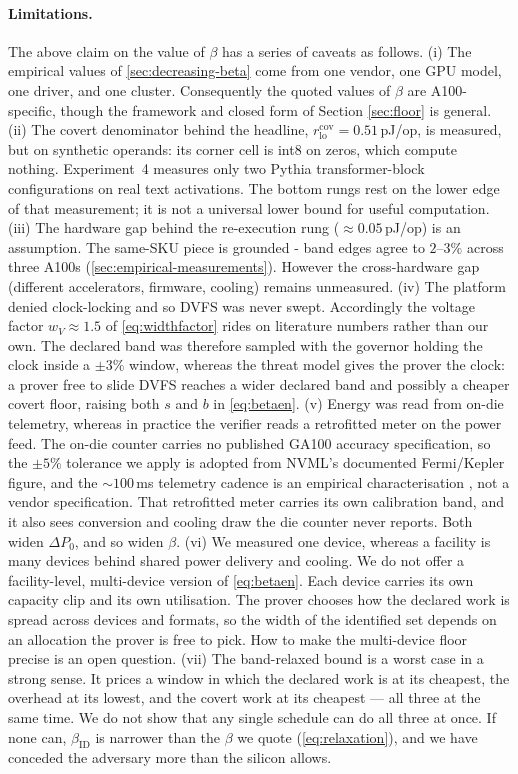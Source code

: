\documentclass{article}
\theoremstyle{plain}
\theoremstyle{definition}
\theoremstyle{remark}
\begin{document}
\paragraph{Limitations.}
The above claim on the value of $\beta$ has a series of caveats as follows. (i) The empirical values of  \cref{sec:decreasing-beta} come from one vendor, one
GPU model, one driver, and one cluster. Consequently the quoted values of $\beta$ are
A100-specific, though the framework and closed form of Section \ref{sec:floor} is general.
(ii) The covert denominator behind the headline,
$r_{\mathrm{lo}}^{\mathrm{cov}} = 0.51$\,pJ/op, is measured, but on synthetic
operands: its corner cell is int8 on zeros, which compute nothing.
Experiment~4 measures only two Pythia transformer-block configurations on real
text activations. The bottom rungs rest on the lower edge of that measurement;
it is not a universal lower bound for useful computation. (iii) The hardware gap behind the
re-execution rung (${\approx}0.05$\,pJ/op) is an assumption. The same-SKU
piece is grounded - band edges agree to $2$--$3\%$ across three A100s
(\cref{sec:empirical-measurements}). However the cross-hardware gap (different
accelerators, firmware, cooling) remains unmeasured. (iv) The platform denied clock-locking and so DVFS was never
swept. Accordingly the voltage factor $w_V \approx 1.5$ of
\cref{eq:widthfactor} rides on literature numbers rather than our own. The
declared band was therefore sampled with the governor
holding the clock inside a $\pm 3\%$ window, whereas the threat model gives
the prover the clock: a prover free to slide DVFS reaches a wider declared
band and possibly a cheaper covert floor, raising both $s$ and $b$ in
\cref{eq:betaen}. (v) Energy was read from on-die telemetry, whereas in
practice the verifier reads a retrofitted meter on the power feed. The on-die
counter carries no published GA100 accuracy specification, so the $\pm 5\%$
tolerance we apply is adopted from NVML's documented Fermi/Kepler figure, and
the ${\sim}100$\,ms telemetry cadence is an empirical characterisation
\citep{yang2023parttime}, not a vendor specification. That retrofitted meter
carries its own calibration band, and it also sees conversion and cooling draw
the die counter never reports. Both widen $\Delta P_0$, and so widen $\beta$. (vi) We measured one device, whereas a facility is
many devices behind shared power delivery and cooling. We do not offer a
facility-level, multi-device version of \cref{eq:betaen}. Each
device carries its own capacity clip and its own utilisation. The
prover chooses how the declared work is spread across devices and formats, so
the width of the identified set depends on an allocation the prover is free to
pick. How to make the multi-device floor precise is an open question.
(vii) The band-relaxed bound is a worst case in a strong sense. It
prices a window in which the declared work is at its cheapest, the overhead at
its lowest, and the covert work at its cheapest --- all three at the same time.
We do not show that any single schedule can do all three at once. If none can,
$\beta_{\mathrm{ID}}$ is narrower than the $\beta$ we quote
(\cref{eq:relaxation}), and we have conceded the adversary
more than the silicon allows.
\end{document}
